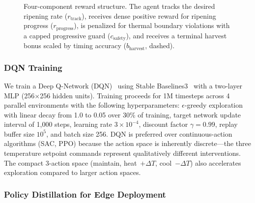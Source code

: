 \documentclass[conference]{IEEEtran}
\begin{document}
\begin{figure}[!t]
{
    }%
    \caption{Four-component reward structure.  The agent tracks the desired ripening rate ($r_{\text{track}}$), receives dense positive reward for ripening progress ($r_{\text{progress}}$), is penalized for thermal boundary violations with a capped progressive guard ($c_{\text{safety}}$), and receives a terminal harvest bonus scaled by timing accuracy ($b_{\text{harvest}}$, dashed).}
    \label{fig:reward}
    \end{figure}

    \subsubsection{DQN Training}

    We train a Deep Q-Network (DQN)~\cite{mnih2015dqn} using Stable Baselines3~\cite{raffin2021sb3} with a two-layer MLP (256$\times$256 hidden units). Training proceeds for 1M timesteps across 4 parallel environments with the following hyperparameters: $\epsilon$-greedy exploration with linear decay from 1.0 to 0.05 over 30\% of training, target network update interval of 1,000 steps, learning rate $3 \times 10^{-4}$, discount factor $\gamma = 0.99$, replay buffer size $10^5$, and batch size 256. DQN is preferred over continuous-action algorithms (SAC, PPO) because the action space is inherently discrete---the three temperature setpoint commands represent qualitatively different interventions. The compact 3-action space (maintain, heat~$+\Delta T$, cool~$-\Delta T$) also accelerates exploration compared to larger action spaces.

    \subsubsection{Policy Distillation for Edge Deployment}
\end{document}

